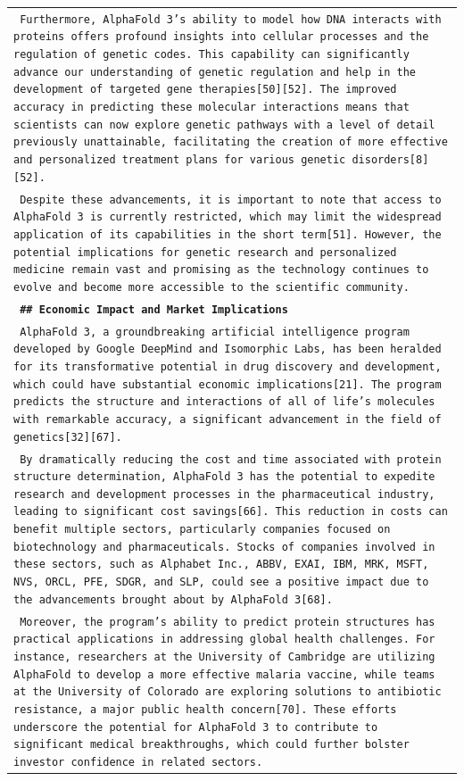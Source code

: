 \begin{longtable}{p{\textwidth}}
\texttt{\small{ Furthermore, AlphaFold 3's ability to model how DNA interacts with proteins offers profound insights into cellular processes and the regulation of genetic codes. This capability can significantly advance our understanding of genetic regulation and help in the development of targeted gene therapies[50][52]. The improved accuracy in predicting these molecular interactions means that scientists can now explore genetic pathways with a level of detail previously unattainable, facilitating the creation of more effective and personalized treatment plans for various genetic disorders[8][52]. }} \\
\texttt{\small{ Despite these advancements, it is important to note that access to AlphaFold 3 is currently restricted, which may limit the widespread application of its capabilities in the short term[51]. However, the potential implications for genetic research and personalized medicine remain vast and promising as the technology continues to evolve and become more accessible to the scientific community. }} \\
\vspace{1pt}
\texttt{\small{\textbf{ \#\# Economic Impact and Market Implications }}} \\
\texttt{\small{ AlphaFold 3, a groundbreaking artificial intelligence program developed by Google DeepMind and Isomorphic Labs, has been heralded for its transformative potential in drug discovery and development, which could have substantial economic implications[21]. The program predicts the structure and interactions of all of life's molecules with remarkable accuracy, a significant advancement in the field of genetics[32][67]. }} \\
\texttt{\small{ By dramatically reducing the cost and time associated with protein structure determination, AlphaFold 3 has the potential to expedite research and development processes in the pharmaceutical industry, leading to significant cost savings[66]. This reduction in costs can benefit multiple sectors, particularly companies focused on biotechnology and pharmaceuticals. Stocks of companies involved in these sectors, such as Alphabet Inc., ABBV, EXAI, IBM, MRK, MSFT, NVS, ORCL, PFE, SDGR, and SLP, could see a positive impact due to the advancements brought about by AlphaFold 3[68]. }} \\
\texttt{\small{ Moreover, the program's ability to predict protein structures has practical applications in addressing global health challenges. For instance, researchers at the University of Cambridge are utilizing AlphaFold to develop a more effective malaria vaccine, while teams at the University of Colorado are exploring solutions to antibiotic resistance, a major public health concern[70]. These efforts underscore the potential for AlphaFold 3 to contribute to significant medical breakthroughs, which could further bolster investor confidence in related sectors. }} \\

\end{longtable}
